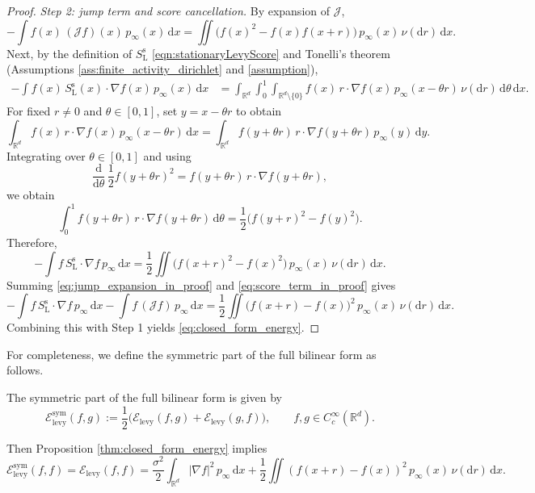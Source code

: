\begin{proof}
\emph{Step 2: jump term and score cancellation.}
By expansion of $\mathcal{J}$,
\begin{equation}\label{eq:jump_expansion_in_proof}
-\int f(x)\,(\mathcal{J}f)(x)\,p_\infty(x)\,\mathrm{d}x
=\iint \big(f(x)^2-f(x)f(x+r)\big)\,p_\infty(x)\,\nu(\mathrm{d}r)\,\mathrm{d}x.
\end{equation}
Next, by the definition  of $S_{\mathrm{L}}^{\mathrm{s}}$ \eqref{eqn:stationaryLevyScore} and Tonelli's theorem (Assumptions \ref{ass:finite_activity_dirichlet} and \ref{assumption}),
\begin{align*}
-\int f(x)\,S_{\mathrm{L}}^{\mathrm{s}}(x)\cdot \nabla f(x)\,p_\infty(x)\,\mathrm{d}x
&=\int_{\mathbb{R}^d}\int_0^1\int_{\mathbb{R}^d\setminus\{0\}}
f(x)\, r\cdot \nabla f(x)\,p_\infty(x-\theta r)\,\nu(\mathrm{d}r)\,\mathrm{d}\theta\,\mathrm{d}x.
\end{align*}
For fixed $r\neq 0$ and $\theta\in[0,1]$, set $y=x-\theta r$ to obtain
\[
\int_{\mathbb{R}^d} f(x)\, r\cdot \nabla f(x)\,p_\infty(x-\theta r)\,\mathrm{d}x
=\int_{\mathbb{R}^d} f(y+\theta r)\, r\cdot \nabla f(y+\theta r)\,p_\infty(y)\,\mathrm{d}y.
\]
Integrating over $\theta\in[0,1]$ and using
\[
\frac{\mathrm{d}}{\mathrm{d}\theta}\,\frac12 f(y+\theta r)^2
= f(y+\theta r)\, r\cdot \nabla f(y+\theta r),
\]
we obtain
\[
\int_0^1 f(y+\theta r)\, r\cdot \nabla f(y+\theta r)\,\mathrm{d}\theta
=\frac12\big(f(y+r)^2-f(y)^2\big).
\]
Therefore,
\begin{equation}\label{eq:score_term_in_proof}
-\int f\,S_{\mathrm{L}}^{\mathrm{s}}\cdot \nabla f\,p_\infty\,\mathrm{d}x
=\frac12\iint \big(f(x+r)^2-f(x)^2\big)\,p_\infty(x)\,\nu(\mathrm{d}r)\,\mathrm{d}x.
\end{equation}
Summing \eqref{eq:jump_expansion_in_proof} and \eqref{eq:score_term_in_proof} gives
\[
-\int f\,S_{\mathrm{L}}^{\mathrm{s}}\cdot \nabla f\,p_\infty\,\mathrm{d}x
-\int f\,(\mathcal{J}f)\,p_\infty\,\mathrm{d}x
=\frac12\iint \big(f(x+r)-f(x)\big)^2\,p_\infty(x)\,\nu(\mathrm{d}r)\,\mathrm{d}x.
\]
Combining this with Step 1 yields \eqref{eq:closed_form_energy}.
\end{proof}

For completeness, we define the symmetric part of the full bilinear form as follows.
\begin{definition}
The symmetric part of the full bilinear form is given by
\[
\mathcal{E}^{\mathrm{sym}}_{\mathrm{levy}}(f,g)
:=\frac12\Big(\mathcal{E}_{\mathrm{levy}}(f,g)+\mathcal{E}_{\mathrm{levy}}(g,f)\Big),
\qquad f,g\in C_c^\infty(\mathbb{R}^d).
\]
\end{definition}
Then Proposition \ref{thm:closed_form_energy} implies
\[
\mathcal{E}^{\mathrm{sym}}_{\mathrm{levy}}(f,f)
=\mathcal{E}_{\mathrm{levy}}(f,f)
=\frac{\sigma^2}{2}\int_{\mathbb{R}^d}|\nabla f|^2\,p_\infty\,\mathrm{d}x
+\frac12\iint (f(x+r)-f(x))^2\,p_\infty(x)\,\nu(\mathrm{d}r)\,\mathrm{d}x.
\]




